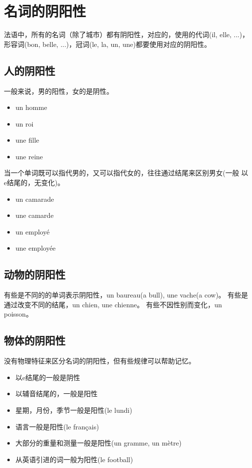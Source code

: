 
\chapter{名词的阴阳性}

法语中，所有的名词（除了城市）都有阴阳性，对应的，使用的代词(il, elle,
...)，形容词(bon, belle, ...)，冠词(le, la, un, une)都要使用对应的阴阳性。


\section{人的阴阳性}



一般来说，男的阳性，女的是阴性。

\begin{itemize}
\item un homme
\item un roi
\item une fille
\item une reine
\end{itemize}


当一个单词既可以指代男的，又可以指代女的，往往通过结尾来区别男女(一般
以e结尾的，无变化)。

\begin{itemize}
\item un camarade
\item une camarde
\item un employé
\item une employée
\end{itemize}



\section{动物的阴阳性}


有些是不同的的单词表示阴阳性，un baureau(a bull), une vache(a cow)。
有些是通过改变不同的结尾，un chien, une chienne。
有些不因性别而变化，un poisson。


\section{物体的阴阳性}

没有物理特征来区分名词的阴阳性，但有些规律可以帮助记忆。
\begin{itemize}
\item 以e结尾的一般是阴性
\item 以辅音结尾的，一般是阳性
\item 星期，月份，季节一般是阳性(le lundi)
\item 语言一般是阳性(le français)
\item 大部分的重量和测量一般是阳性(un gramme, un mètre)
\item 从英语引进的词一般为阳性(le football)
\end{itemize}


